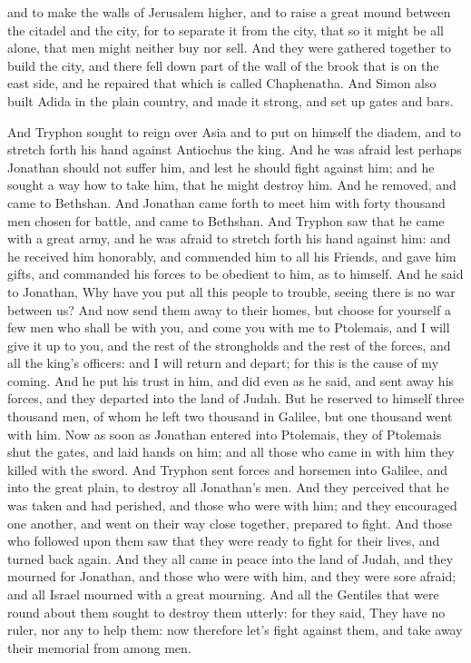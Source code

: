 {and to make the walls of Jerusalem higher, and to raise a great mound between the citadel and the city, for to separate it from the city, that so it might be all alone, that men might neither buy nor sell.
And they were gathered together to build the city, and there fell down part of the wall of the brook that is on the east side, and he repaired that which is called Chaphenatha.
And Simon also built Adida in the
 plain country, and made it strong, and set up gates and bars.
\par }{\PP {}And Tryphon sought to reign over Asia and to put on himself the diadem, and to stretch forth his hand against Antiochus the king.
And he was afraid lest perhaps Jonathan should not suffer him, and lest he should fight against him; and he sought a way how to take him, that he might destroy him. And he removed, and came to Bethshan.
And Jonathan came forth to meet him with forty thousand men chosen for battle, and came to Bethshan.
And Tryphon saw that he came with a great army, and he was afraid to stretch forth his hand against him:
and he received him honorably, and commended him to all his
 Friends, and gave him gifts, and commanded his forces to be obedient to him, as to himself.
And he said to Jonathan, Why have you put all this people to trouble, seeing there is no war between us?
And now send them away to their homes, but choose for yourself a few men who shall be with you, and come you with me to Ptolemais, and I will give it up to you, and the rest of the strongholds and the rest of the forces, and all the king’s officers: and I will return and depart; for this is the cause of my coming.
And he put his trust in him, and did even as he said, and sent away his forces, and they departed into the land of Judah.
But he reserved to himself three thousand men, of whom he left two thousand in Galilee, but one thousand went with him.
Now as soon as Jonathan entered into Ptolemais, they of Ptolemais shut the gates, and laid hands on him; and all those who came in with him they killed with the sword.
And Tryphon sent forces and horsemen into Galilee, and into the great plain, to destroy all Jonathan’s men.
And they perceived that he was taken and had perished, and those who were with him; and they encouraged one another, and went on their way close together, prepared to fight.
And those who followed upon them saw that they were ready to fight for their lives, and turned back again.
And they all came in peace into the land of Judah, and they mourned for Jonathan, and those who were with him, and they were sore afraid; and all Israel mourned with a great mourning.
And all the Gentiles that were round about them sought to destroy them utterly: for they said, They have no ruler, nor any to help them: now therefore let’s fight against them, and take away their memorial from among men.

}
